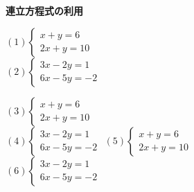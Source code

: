 \documentclass[17pt,b4paper, landscape]{ltjsarticle}%
\begin{document}
{\textbf{\Large{連立方程式の利用}}}\hspace{\fill}{\scalebox{1.5}{（　）組（　　　　　　　　）}}\\
\begin{multicols*}{3}
$(1)\begin{cases}
	x + y = 6\\ 2x + y = 10
\end{cases}$ 	\\[75mm]
$(2)\begin{cases}
	3x - 2y = 1\\ 6x -5y = -2
\end{cases}$\vfill\null\columnbreak

$(3)\begin{cases}
	x + y = 6\\ 2x + y = 10
\end{cases}$ 	\\[75mm]
$(4)\begin{cases}
	3x - 2y = 1\\ 6x -5y = -2
\end{cases}$
 \vfill\null\columnbreak
$(5)\begin{cases}
	x + y = 6\\ 2x + y = 10
\end{cases}$ 	\\[75mm]
$(6)\begin{cases}
	3x - 2y = 1\\ 6x -5y = -2
\end{cases}$



\end{multicols*}
\end{document}
